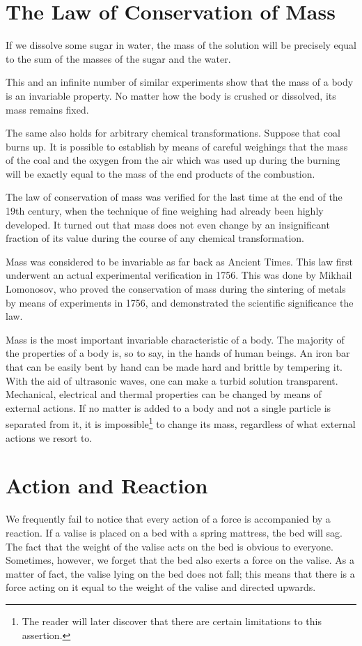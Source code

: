 \section{The Law of Conservation of Mass}
If we dissolve some sugar in water, the mass of the solution will be
precisely equal to the sum of the masses of the sugar and the water.

This and an infinite number of similar experiments show that the mass
of a body is an invariable property.  No matter how the body is
crushed or dissolved, its mass remains fixed.  


The same also holds for arbitrary chemical transformations. Suppose
that coal burns up. It is possible to establish by means of careful
weighings that the mass of the coal and the oxygen from the air which
was used up during the burning will be exactly equal to the mass of
the end products of the combustion.  

The law of conservation of mass
was verified for the last time at the end of the 19th century, when
the technique of fine weighing had already been highly developed.
It turned out that mass does not even change by an insignificant
fraction of its value during the course of any chemical
transformation.  

Mass was considered to be invariable as far back as
Ancient Times. This law first underwent an actual experimental
verification in 1756. This was done by Mikhail Lomonosov, who proved
the conservation of mass during the sintering of metals by means of
experiments in 1756, and demonstrated the scientific significance the
law.  

Mass is the most important invariable characteristic of a
body. The majority of the properties of a body is, so to say, in the
hands of human beings. An iron bar that can be easily bent by hand can
be made hard and brittle by tempering it. With the aid of ultrasonic
waves, one can make a turbid solution transparent. Mechanical,
electrical and thermal properties can be changed by means of external
actions. If no matter is added to a body and not a single particle is
separated from it, it is impossible\footnote{The reader will later
  discover that there are certain limitations to this assertion.} to
change its mass, regardless of what external actions we resort to.



\section{Action and Reaction}
We frequently fail to notice that every action of a
force is accompanied by a reaction. If a valise is placed
on a bed with a spring mattress, the bed will sag. The fact
that the weight of the valise acts on the bed is obvious
to everyone. Sometimes, however, we forget that the bed
also exerts a force on the valise. As a matter of fact,
the valise lying on the bed does not fall; this means that
there is a force acting on it equal to the weight of the
valise and directed upwards.

